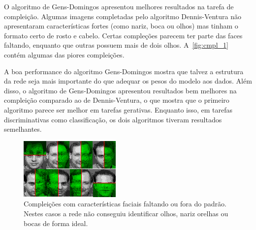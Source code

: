 \documentclass[12pt]{article}
\theoremstyle{plain}
\numberwithin{equation}{section}
\begin{document}
O algoritmo de Gens-Domingos apresentou melhores resultados na tarefa de compleição. Algumas
imagens completadas pelo algoritmo Dennis-Ventura não apresentaram características fortes (como
nariz, boca ou olhos) mas tinham o formato certo de rosto e cabelo. Certas compleções parecem ter
parte das faces faltando, enquanto que outras possuem mais de dois olhos. A~\autoref{fig:cmpl_1}
contém algumas das piores compleições.

A boa performance do algoritmo Gens-Domingos mostra que talvez a estrutura da rede seja mais
importante do que adequar os pesos do modelo aos dados. Além disso, o algoritmo de Gens-Domingos
apresentou resultados bem melhores na compleição comparado ao de Dennis-Ventura, o que mostra que o
primeiro algoritmo parece ser melhor em tarefas gerativas. Enquanto isso, em tarefas
discriminativas como classificação, os dois algoritmos tiveram resultados semelhantes.

\begin{figure}[H]
  \centering\includegraphics[scale=2.5]{cmpl/notfine/notfine.png}
  \caption{Compleições com características faciais faltando ou fora do padrão. Nestes casos a rede
    não conseguiu identificar olhos, nariz orelhas ou bocas de forma ideal.\label{fig:cmpl_1}}
\end{figure}
\end{document}
